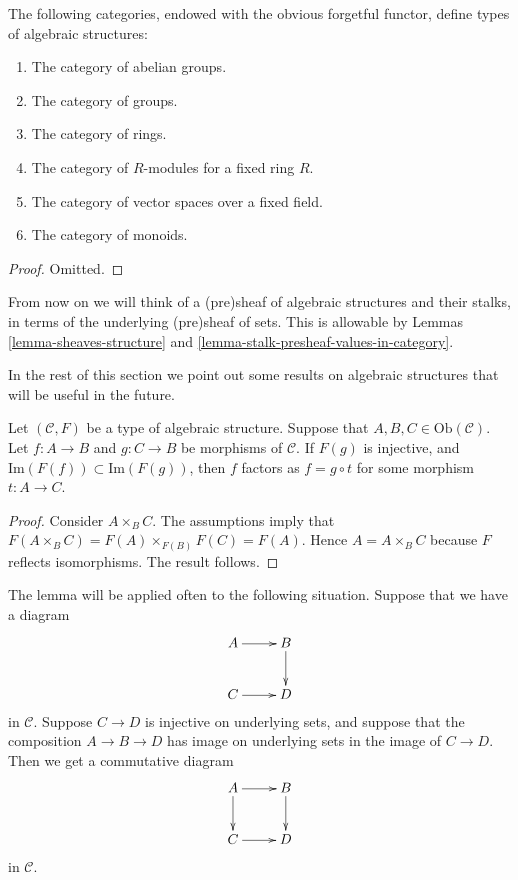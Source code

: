 \begin{lemma}
\label{lemma-list-algebraic-structures}
The following categories, endowed with the obvious forgetful
functor, define types of algebraic structures:
\begin{enumerate}
\item The category of abelian groups.
\item The category of groups.
\item The category of rings.
\item The category of $R$-modules for a fixed ring $R$.
\item The category of vector spaces over a fixed field.
\item The category of monoids.
\end{enumerate}
\end{lemma}

\begin{proof}
Omitted.
\end{proof}

\noindent
From now on we will think of a (pre)sheaf of algebraic structures
and their stalks, in terms of the underlying (pre)sheaf of sets.
This is allowable by Lemmas \ref{lemma-sheaves-structure} and
\ref{lemma-stalk-presheaf-values-in-category}.

\medskip\noindent
In the rest of this section we point out some results
on algebraic structures that will be useful in the future.

\begin{lemma}
\label{lemma-image-contained-in}
Let $(\mathcal{C}, F)$ be a type of algebraic structure.
Suppose that $A, B, C \in \text{Ob}(\mathcal{C})$.
Let $f : A \to B$ and $g : C \to B$ be morphisms of
$\mathcal{C}$. If $F(g)$ is injective, and
$\text{Im}(F(f)) \subset \text{Im}(F(g))$, then 
$f$ factors as $f = g \circ t$ for some morphism
$t : A \to C$.
\end{lemma}

\begin{proof}
Consider $A \times_B C$. The assumptions imply that
$F(A \times_B C) = F(A) \times_{F(B)} F(C) = F(A)$.
Hence $A = A\times_B C$ because $F$ reflects isomorphisms.
The result follows.
\end{proof}

\begin{example}
\label{example-application-lemma-image-contained-in}
The lemma will be applied often to the following situation.
Suppose that we have a diagram
$$
\xymatrix{
A \ar[r] & B \ar[d] \\
C \ar[r] & D 
}
$$
in $\mathcal{C}$. Suppose $C \to D$ is injective on underlying
sets, and suppose that the composition $A \to B \to D$ has
image on underlying sets in the image of $C \to D$. 
Then we get a commutative diagram
$$
\xymatrix{
A \ar[r] \ar[d] & B \ar[d] \\
C \ar[r] & D 
}
$$
in $\mathcal{C}$.
\end{example}

